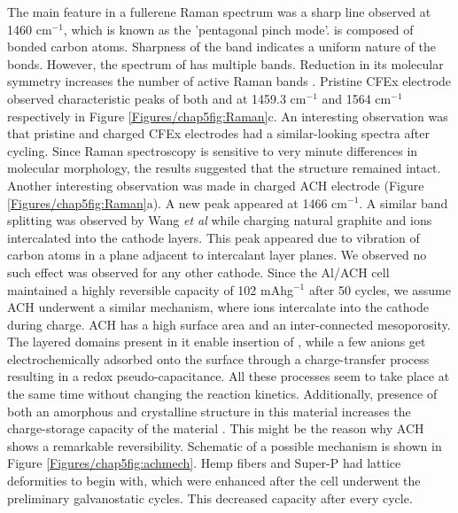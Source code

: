 The main feature in a fullerene Raman spectrum was a sharp line observed at 1460 cm$^{-1}$, which is known as the 'pentagonal pinch mode'.  is composed of  bonded carbon atoms. Sharpness of the band indicates a uniform nature of the bonds. However, the spectrum of  has multiple bands. Reduction in its molecular symmetry increases the number of active Raman bands \cite{kimbrell_analysis_2014}. Pristine CFEx electrode observed characteristic peaks of both  and  at 1459.3 cm$^{-1}$ and 1564 cm$^{-1}$ respectively in Figure \ref{Figures/chap5fig:Raman}c. An interesting observation was that pristine and charged CFEx electrodes had a similar-looking spectra after cycling. Since Raman spectroscopy is sensitive to very minute differences in molecular morphology, the results suggested that the structure remained intact. Another interesting observation was made in charged ACH electrode (Figure \ref{Figures/chap5fig:Raman}a). A new peak appeared at 1466 cm$^{-1}$. A similar band splitting was observed by Wang \textit{et al} \cite{wang_kish_2017} while charging natural graphite and  ions intercalated into the cathode layers. This peak appeared due to vibration of carbon atoms in a plane adjacent to intercalant layer planes. We observed no such effect was observed for any other cathode. Since the Al/ACH cell maintained a highly reversible capacity of 102 mAhg$^{-1}$ after 50 cycles, we assume ACH underwent a similar mechanism, where  ions intercalate into the cathode during charge. ACH has a high surface area and an inter-connected mesoporosity. The layered domains present in it enable insertion of , while a few anions get electrochemically adsorbed onto the surface through a charge-transfer process resulting in a redox pseudo-capacitance. All these processes seem to take place at the same time without changing the reaction kinetics. Additionally, presence of both an amorphous and crystalline structure in this material increases the charge-storage capacity of the material \cite{brezesinski_ordered_2010}. This might be the reason why ACH shows a remarkable reversibility. Schematic of a possible mechanism is shown in Figure \ref{Figures/chap5fig:achmech}. Hemp fibers and Super-P had lattice deformities to begin with, which were enhanced after the cell underwent the preliminary galvanostatic cycles. This decreased capacity after every cycle. 

